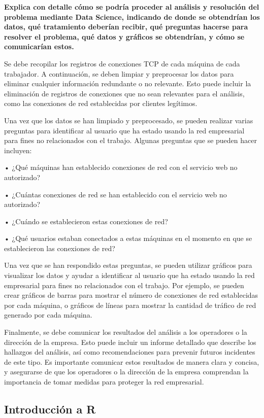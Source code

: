 \documentclass[
]{article}
\begin{document}
\textbf{Explica con detalle cómo se podría proceder al análisis y
resolución del problema mediante Data Science, indicando de donde se
obtendrían los datos, qué tratamiento deberían recibir, qué preguntas
hacerse para resolver el problema, qué datos y gráficos se obtendrían, y
cómo se comunicarían estos.}

Se debe recopilar los registros de conexiones TCP de cada máquina de
cada trabajador. A continuación, se deben limpiar y preprocesar los
datos para eliminar cualquier información redundante o no relevante.
Esto puede incluir la eliminación de registros de conexiones que no sean
relevantes para el análisis, como las conexiones de red establecidas por
clientes legítimos.

Una vez que los datos se han limpiado y preprocesado, se pueden realizar
varias preguntas para identificar al usuario que ha estado usando la red
empresarial para fines no relacionados con el trabajo. Algunas preguntas
que se pueden hacer incluyen:

• ¿Qué máquinas han establecido conexiones de red con el servicio web no
autorizado?

• ¿Cuántas conexiones de red se han establecido con el servicio web no
autorizado?

• ¿Cuándo se establecieron estas conexiones de red?

• ¿Qué usuarios estaban conectados a estas máquinas en el momento en que
se establecieron las conexiones de red?

Una vez que se han respondido estas preguntas, se pueden utilizar
gráficos para visualizar los datos y ayudar a identificar al usuario que
ha estado usando la red empresarial para fines no relacionados con el
trabajo. Por ejemplo, se pueden crear gráficos de barras para mostrar el
número de conexiones de red establecidas por cada máquina, o gráficos de
líneas para mostrar la cantidad de tráfico de red generado por cada
máquina.

Finalmente, se debe comunicar los resultados del análisis a los
operadores o la dirección de la empresa. Esto puede incluir un informe
detallado que describe los hallazgos del análisis, así como
recomendaciones para prevenir futuros incidentes de este tipo. Es
importante comunicar estos resultados de manera clara y concisa, y
asegurarse de que los operadores o la dirección de la empresa comprendan
la importancia de tomar medidas para proteger la red empresarial.

\hypertarget{introducciuxf3n-a-r}{%
\subsection{Introducción a R}\label{introducciuxf3n-a-r}}
\end{document}
